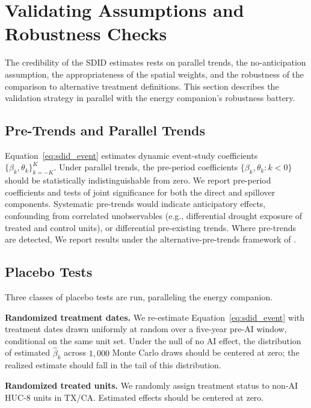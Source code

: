 \documentclass[11pt, letterpaper]{article}
\begin{document}
\section{Validating Assumptions and Robustness Checks}
\label{sec:robustness}

The credibility of the SDID estimates rests on parallel trends, the no-anticipation assumption, the appropriateness of the spatial weights, and the robustness of the comparison to alternative treatment definitions. This section describes the validation strategy in parallel with the energy companion's robustness battery.

\subsection{Pre-Trends and Parallel Trends}
\label{sec:pretrends}

Equation~\eqref{eq:sdid_event} estimates dynamic event-study coefficients $\{\beta_k, \theta_k\}_{k=-K}^{K}$. Under parallel trends, the pre-period coefficients $\{\beta_k, \theta_k : k < 0\}$ should be statistically indistinguishable from zero. We report pre-period coefficients and tests of joint significance for both the direct and spillover components. Systematic pre-trends would indicate anticipatory effects, confounding from correlated unobservables (e.g., differential drought exposure of treated and control units), or differential pre-existing trends. Where pre-trends are detected, We report results under the alternative-pre-trends framework of \citet{rambachan2023more}.

\subsection{Placebo Tests}
\label{sec:placebo}

Three classes of placebo tests are run, paralleling the energy companion.

\textbf{Randomized treatment dates.} We re-estimate Equation~\eqref{eq:sdid_event} with treatment dates drawn uniformly at random over a five-year pre-AI window, conditional on the same unit set. Under the null of no AI effect, the distribution of estimated $\widehat{\beta}_k$ across $1{,}000$ Monte Carlo draws should be centered at zero; the realized estimate should fall in the tail of this distribution.

\textbf{Randomized treated units.} We randomly assign treatment status to non-AI HUC-8 units in TX/CA. Estimated effects should be centered at zero.
\end{document}
